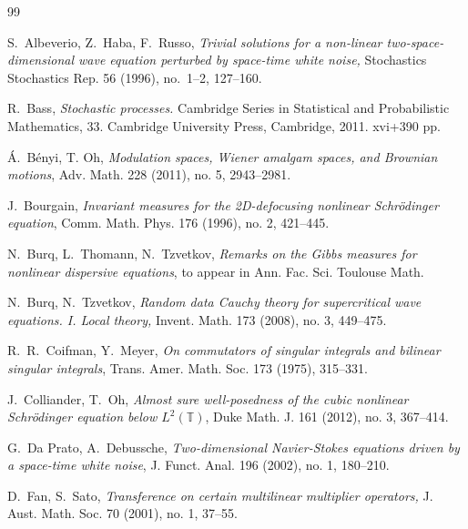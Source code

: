 \documentclass[letterpaper, 11pt,  reqno]{amsart}
\newcommand{\1}{\hspace{0.5mm}\text{I}\hspace{0.5mm}}
\newcommand{\T}{\mathbb{T}}
\numberwithin{equation}{section}
\numberwithin{theorem}{section}
\begin{document}
\begin{thebibliography}{99}





S.~Albeverio, Z.~Haba, F.~Russo, 
{\it Trivial solutions for a non-linear two-space-dimensional wave equation perturbed by space-time white noise,} Stochastics Stochastics Rep.  56 (1996), no.~1--2, 127--160. 


R.~Bass, 
{\it Stochastic processes.}
Cambridge Series in Statistical and Probabilistic Mathematics, 33. Cambridge University Press, Cambridge, 2011. xvi+390 pp. 


\'A.~B\'enyi, T. Oh, 
{\it Modulation spaces, Wiener amalgam spaces, and Brownian motions}, Adv. Math. 228 (2011), no. 5, 2943--2981.



J.~Bourgain, 
{\it Invariant measures for the 2D-defocusing nonlinear Schr\"odinger equation}, 
Comm. Math. Phys. 176 (1996), no. 2, 421--445. 


N.~Burq, L.~Thomann, N.~Tzvetkov, 
{\it Remarks on the Gibbs measures for nonlinear dispersive equations}, 
to appear in Ann. Fac. Sci. Toulouse Math.



N.~Burq, N.~Tzvetkov,
{\it Random data Cauchy theory for supercritical wave equations. I. Local theory,}
Invent. Math. 173 (2008), no. 3, 449--475.




R.~R.~Coifman,  Y.~Meyer,
{\it On commutators of singular integrals and bilinear singular
              integrals}, Trans. Amer. Math. Soc. 173 (1975), 315--331.
 

J.~Colliander, T.~Oh, {\it  Almost sure well-posedness of the cubic nonlinear Schr\"odinger equation below $L^2(\T)$}, Duke Math. J. 161 (2012), no. 3, 367--414. 





G.~Da Prato, A.~Debussche, 
{\it Two-dimensional Navier-Stokes equations driven by a space-time white noise}, 
J. Funct. Anal. 196 (2002), no. 1, 180--210.



D.~Fan, S.~Sato, {\it Transference on certain multilinear multiplier operators,}
 J. Aust. Math. Soc. 70 (2001), no. 1, 37--55.






\end{thebibliography}
\end{document}
